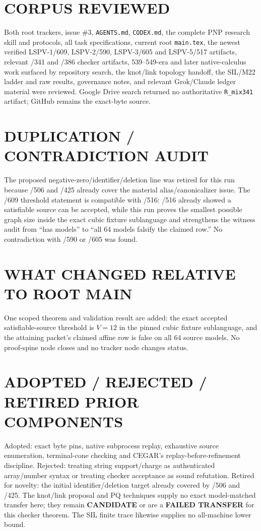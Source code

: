 \documentclass[11pt]{article}
\newcommand{\status}[1]{\textbf{#1}}
\begin{document}
\section*{CORPUS REVIEWED}
Both root trackers, issue \#3, \texttt{AGENTS.md}, \texttt{CODEX.md}, the complete PNP research skill and protocols, all task specifications, current root \texttt{main.tex}, the newest verified LSPV-1/609, LSPV-2/590, LSPV-3/605 and LSPV-5/517 artifacts, relevant /341 and /386 checker artifacts, 539--549-era and later native-calculus work surfaced by repository search, the knot/link topology handoff, the SIL/M22 ladder and raw results, governance notes, and relevant Grok/Claude ledger material were reviewed.  Google Drive search returned no authoritative \texttt{R\_mix341} artifact; GitHub remains the exact-byte source.

\section*{DUPLICATION / CONTRADICTION AUDIT}
The proposed negative-zero/identifier/deletion line was retired for this run because /506 and /425 already cover the material alias/canonicalizer issue.  The /609 threshold statement is compatible with /516: /516 already showed a satisfiable source can be accepted, while this run proves the smallest possible graph size inside the exact cubic fixture sublanguage and strengthens the witness audit from ``has models'' to ``all 64 models falsify the claimed row.''  No contradiction with /590 or /605 was found.

\section*{WHAT CHANGED RELATIVE TO ROOT MAIN}
One scoped theorem and validation result are added: the exact accepted satisfiable-source threshold is \(V=12\) in the pinned cubic fixture sublanguage, and the attaining packet's claimed affine row is false on all 64 source models.  No proof-spine node closes and no tracker node changes status.

\section*{ADOPTED / REJECTED / RETIRED PRIOR COMPONENTS}
Adopted: exact byte pins, native subprocess replay, exhaustive source enumeration, terminal-cone checking and CEGAR's replay-before-refinement discipline.  Rejected: treating string support/charge as authenticated array/number syntax or treating checker acceptance as sound refutation.  Retired for novelty: the initial identifier/deletion target already covered by /506 and /425.  The knot/link proposal and PQ techniques supply no exact model-matched transfer here; they remain \status{CANDIDATE} or are a \status{FAILED TRANSFER} for this checker theorem.  The SIL finite trace likewise supplies no all-machine lower bound.
\end{document}
